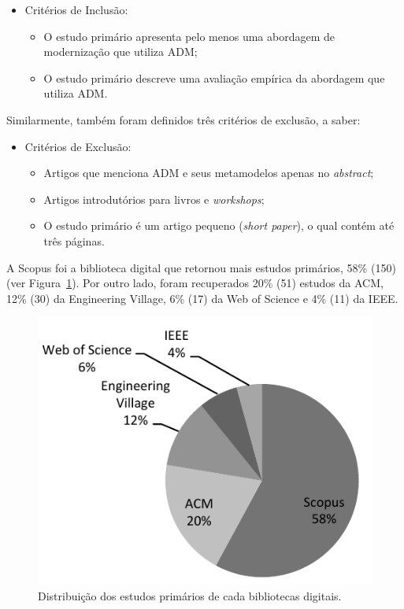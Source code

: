\begin{itemize}
\item Critérios de Inclusão:
    \begin{itemize}
    \item O estudo primário apresenta pelo menos uma abordagem de modernização que utiliza ADM;
    \item O estudo primário descreve uma avaliação empírica da abordagem que utiliza ADM.
    \end{itemize}
\end{itemize}

Similarmente, também foram definidos três critérios de exclusão, a saber:

\begin{itemize}
\item Critérios de Exclusão:
    \begin{itemize}
    \item Artigos que menciona ADM e seus metamodelos apenas no \textit{abstract};
    \item Artigos introdutórios para livros e \textit{workshops};
    \item O estudo primário é um artigo pequeno (\textit{short paper}), o qual contém até três páginas.
    \end{itemize}
\end{itemize}

A Scopus foi a biblioteca digital que retornou mais estudos primários, 58\% (150) (ver Figura~\ref{fig:distribuicao_biblioteca_digital}). Por outro lado, foram recuperados 20\% (51) estudos da ACM, 12\% (30) da Engineering Village, 6\% (17) da Web of Science e 4\% (11) da IEEE. 

\begin{figure}[h]
 \caption{Distribuição dos estudos primários de cada bibliotecas digitais.}
 \label{fig:distribuicao_biblioteca_digital}
 \centering
 \includegraphics[scale=0.9]{images/retornoDasBasesMS}
 \fautor
\end{figure}

